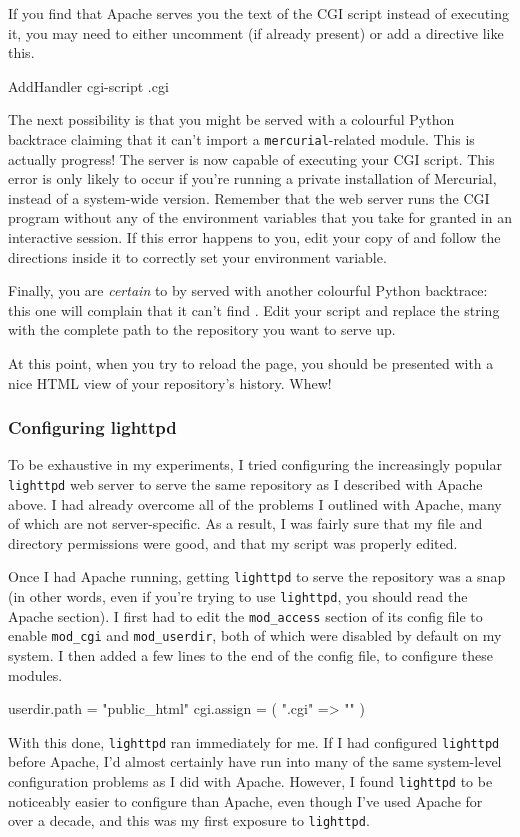 If you find that Apache serves you the text of the CGI script instead
of executing it, you may need to either uncomment (if already present)
or add a directive like this.
\begin{codesample2}
  AddHandler cgi-script .cgi
\end{codesample2}

The next possibility is that you might be served with a colourful
Python backtrace claiming that it can't import a
\texttt{mercurial}-related module.  This is actually progress!  The
server is now capable of executing your CGI script.  This error is
only likely to occur if you're running a private installation of
Mercurial, instead of a system-wide version.  Remember that the web
server runs the CGI program without any of the environment variables
that you take for granted in an interactive session.  If this error
happens to you, edit your copy of  and follow the
directions inside it to correctly set your 
environment variable.

Finally, you are \emph{certain} to by served with another colourful
Python backtrace: this one will complain that it can't find
.  Edit your  script
and replace the  string with the complete
path to the repository you want to serve up.

At this point, when you try to reload the page, you should be
presented with a nice HTML view of your repository's history.  Whew!

\subsubsection{Configuring lighttpd}

To be exhaustive in my experiments, I tried configuring the
increasingly popular \texttt{lighttpd} web server to serve the same
repository as I described with Apache above.  I had already overcome
all of the problems I outlined with Apache, many of which are not
server-specific.  As a result, I was fairly sure that my file and
directory permissions were good, and that my 
script was properly edited.

Once I had Apache running, getting \texttt{lighttpd} to serve the
repository was a snap (in other words, even if you're trying to use
\texttt{lighttpd}, you should read the Apache section).  I first had
to edit the \texttt{mod\_access} section of its config file to enable
\texttt{mod\_cgi} and \texttt{mod\_userdir}, both of which were
disabled by default on my system.  I then added a few lines to the end
of the config file, to configure these modules.
\begin{codesample2}
  userdir.path = "public_html"
  cgi.assign = ( ".cgi" => "" )
\end{codesample2}
With this done, \texttt{lighttpd} ran immediately for me.  If I had
configured \texttt{lighttpd} before Apache, I'd almost certainly have
run into many of the same system-level configuration problems as I did
with Apache.  However, I found \texttt{lighttpd} to be noticeably
easier to configure than Apache, even though I've used Apache for over
a decade, and this was my first exposure to \texttt{lighttpd}.

